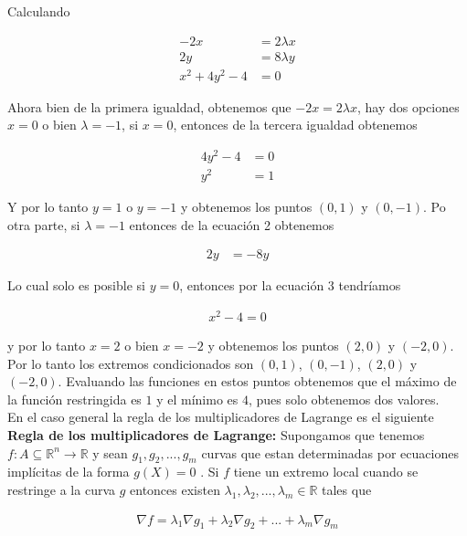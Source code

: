 \documentclass{article}
\theoremstyle{plain}
\theoremstyle{definition}
\begin{document}
Calculando

\begin{align*}
    -2x &=2\lambda x \\
    2y &= 8\lambda y \\
    x^2+4y^2-4 &= 0
\end{align*}

Ahora bien de la primera igualdad, obtenemos que $-2x=2\lambda x$, hay dos opciones $x=0$ o bien $\lambda = -1$, si $x=0$, entonces de la tercera igualdad obtenemos

\begin{align*}
    4y^2-4 &= 0 \\
    y^2 &=1
\end{align*}

Y por lo tanto $y=1$ o $y=-1$ y obtenemos los puntos $(0,1)$ y $(0,-1)$. Po otra parte, si $\lambda =-1$ entonces de la ecuación 2 obtenemos

\begin{align*}
    2y &= -8 y
\end{align*}

Lo cual solo es posible si $y=0$, entonces por la ecuación 3 tendríamos

\begin{align*}
 x^2-4=0
\end{align*}

y por lo tanto $x=2$ o bien $x=-2$ y obtenemos los puntos $(2,0)$ y $(-2,0)$. Por lo tanto los extremos condicionados son $(0,1)$, $(0,-1)$, $(2,0)$ y $(-2,0)$. Evaluando las funciones en estos puntos obtenemos que el máximo de la función restringida es $1$ y el mínimo es $4$, pues solo obtenemos dos valores. \\



En el caso general la regla de los multiplicadores de Lagrange es el siguiente \\

\textbf{Regla de los multiplicadores de Lagrange: } Supongamos que tenemos $f: A \subseteq \mathbb{R}^n \to \mathbb{R}$ y sean $g_1,g_2,...,g_m$ curvas que estan determinadas por ecuaciones implícitas de la forma $g(X)=0$ . Si $f$ tiene un extremo local cuando se restringe a la curva $g$ entonces existen $\lambda_1,\lambda_2,... ,\lambda_m \in \mathbb{R}$ tales que

\begin{align*}
    \nabla f = \lambda_1 \nabla g_1 +\lambda_2 \nabla g_2 + ... + \lambda_m \nabla g_m
\end{align*}
\end{document}
